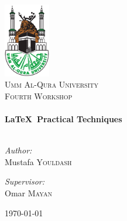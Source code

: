 \begin{titlepage}
 
	\begin{center}
 
		\includegraphics[width=0.15\textwidth]{UQU-LOGO}\\[1cm]
 
		\textsc{\LARGE Umm Al-Qura University}\\[1.5cm]
		\textsc{\Large Fourth Workshop}\\[0.5cm]
 
		\HRule \\[0.4cm]
		{ \huge \bfseries \LaTeX\ Practical Techniques}\\[0.4cm]
 
		\HRule \\[1.5cm]
 
		\begin{minipage}{0.4\textwidth}
		\begin{flushleft} \large
		\emph{Author:}\\
		Mustafa \textsc{Youldash}
		\end{flushleft}
		\end{minipage}
		\begin{minipage}{0.4\textwidth}
		\begin{flushright} \large
		\emph{Supervisor:} \\
		Omar \textsc{Mayan}
		\end{flushright}
		\end{minipage}
 
		\vfill
 
		\vfill
 
		{\large \today}
 
	\end{center}
 
\end{titlepage}
